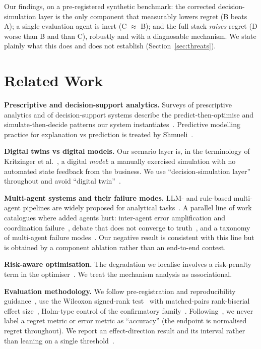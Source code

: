 \documentclass[conference]{IEEEtran}
\begin{document}
Our findings, on a pre-registered synthetic benchmark: the corrected
decision-simulation layer is the only component that measurably lowers regret
(B beats A); a single evaluation agent is inert (C $\approx$ B); and the full
stack \emph{raises} regret (D worse than B and than C), robustly and with a
diagnosable mechanism. We state plainly what this does and does not establish
(Section~\ref{sec:threats}).

\section{Related Work}
\textbf{Prescriptive and decision-support analytics.} Surveys of prescriptive
analytics and of decision-support systems describe the predict-then-optimise and
simulate-then-decide patterns our system instantiates~\cite{Lepenioti2020,Arnott2014}.
Predictive modelling practice for explanation vs prediction is
treated by Shmueli~\cite{Shmueli2011}.

\textbf{Digital twins vs digital models.} Our scenario layer is, in the
terminology of Kritzinger et al.~\cite{Kritzinger2018}, a digital \emph{model}:
a manually exercised simulation with no automated state feedback from the
business. We use ``decision-simulation layer'' throughout and avoid ``digital
twin''~\cite{Grieves2017,Tao2019,Jones2020}.

\textbf{Multi-agent systems and their failure modes.} LLM- and rule-based
multi-agent pipelines are widely proposed for analytical
tasks~\cite{Du2023,Liang2024,Li2024,Zheng2023}. A parallel line of work
catalogues where added agents hurt: inter-agent error amplification and
coordination failure~\cite{Wang2024}, debate that does not converge to
truth~\cite{Smit2024,Huang2024}, and a taxonomy of multi-agent failure
modes~\cite{Cemri2025,Yang2024}. Our negative result is consistent with this
line but is obtained by a component ablation rather than an end-to-end contest.

\textbf{Risk-aware optimisation.} The degradation we localise involves a
risk-penalty term in the optimiser~\cite{Garcia2015}. We treat the mechanism
analysis as associational.

\textbf{Evaluation methodology.} We follow pre-registration and
reproducibility guidance~\cite{Nosek2018,Baker2016,Pineau2021}, use the Wilcoxon
signed-rank test~\cite{Wilcoxon1945} with matched-pairs rank-biserial effect
size~\cite{Kerby2014,Fritz2012}, Holm-type control of the confirmatory
family~\cite{Benjamini1995}. Following~\cite{Hyndman2006}, we never label a
regret metric or error metric as ``accuracy'' (the endpoint is normalised
regret throughout). We report an effect-direction result and its
interval rather than leaning on a single threshold~\cite{Wasserstein2016,Rosenthal1979}.
\end{document}
